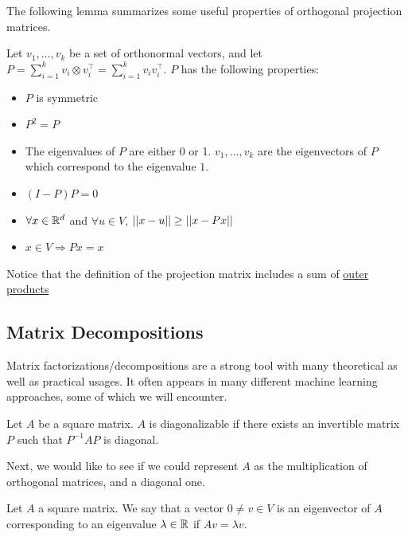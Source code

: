 The following lemma summarizes some useful properties of orthogonal projection matrices.
\begin{lemma}
Let $v_1,\ldots,v_k$ be a set of orthonormal vectors, and let $P=\sum_{i=1}^{k}v_i \otimes  v_i^\top=\sum_{i=1}^{k}v_{i}v_{i}^{\top}$. $P$ has the following properties:
	
\begin{itemize}
	\item $P$ is symmetric
	\item $P^{2}=P$
	\item The eigenvalues of $P$ are either 0 or 1. $v_1,\ldots,v_k$
	are the eigenvectors of $P$ which correspond to the eigenvalue $1$.
	\item $(I-P)P=0$
	\item $\forall x\in\mathbb{R}^d$ and $\forall u\in V$, $\left|\left| x-u\right|\right| \geq \left|\left| x-Px\right|\right|$
	\item $x\in V\Rightarrow Px=x$
\end{itemize}
\end{lemma}

\begin{remark}
Notice that the definition of the projection matrix includes a sum of \href{https://en.wikipedia.org/wiki/Outer_product}{outer products}
\end{remark}


\subsection{Matrix Decompositions}
Matrix factorizations/decompositions are a strong tool with many theoretical as well as practical usages. It often appears in many different machine learning approaches, some of which we will encounter.

\begin{definition}
Let $A$ be a square matrix. $A$ is diagonalizable if there exists an invertible matrix $P$ such that $P^{-1}AP$ is diagonal.
\end{definition}

Next, we would like to see if we could represent $A$ as the multiplication of orthogonal matrices, and a diagonal one.

\begin{definition}
Let $A$ a square matrix. We say that a vector $0\neq v\in V$ is an eigenvector of $A$ corresponding to an eigenvalue $\lambda\in\mathbb{R}$ if $Av=\lambda v$.
\end{definition}

